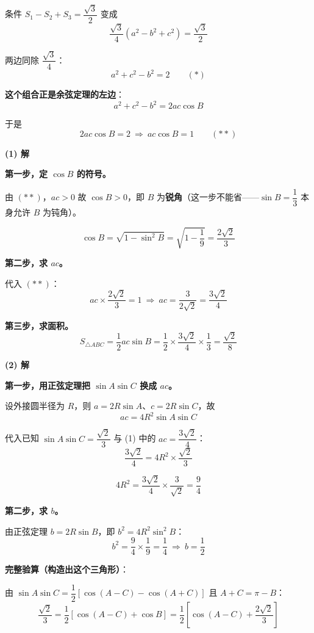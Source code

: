 条件 $S_1-S_2+S_3=\dfrac{\sqrt3}2$ 变成
\[\frac{\sqrt3}4\left(a^{2}-b^{2}+c^{2}\right)=\frac{\sqrt3}2\]

两边同除 $\dfrac{\sqrt3}4$：
\[a^{2}+c^{2}-b^{2}=2\qquad(\ast)\]

\textbf{这个组合正是余弦定理的左边}：
\[a^{2}+c^{2}-b^{2}=2ac\cos B\]

于是
\[2ac\cos B=2\ \Longrightarrow\ ac\cos B=1\qquad(\ast\ast)\]

\par\medskip

\textbf{(1) 解}

\textbf{第一步，定 $\cos B$ 的符号。}

由 $(\ast\ast)$，$ac>0$ 故 $\cos B>0$，即 $B$ 为\textbf{锐角}（这一步不能省——$\sin B=\dfrac13$ 本身允许 $B$ 为钝角）。

\[\cos B=\sqrt{1-\sin^{2}B}=\sqrt{1-\frac19}=\frac{2\sqrt2}3\]

\textbf{第二步，求 $ac$。}

代入 $(\ast\ast)$：
\[ac\times\frac{2\sqrt2}3=1\ \Longrightarrow\ ac=\frac3{2\sqrt2}=\frac{3\sqrt2}4\]

\textbf{第三步，求面积。}
\[S_{\triangle ABC}=\frac12ac\sin B=\frac12\times\frac{3\sqrt2}4\times\frac13=\frac{\sqrt2}8\]


\par\medskip

\textbf{(2) 解}

\textbf{第一步，用正弦定理把 $\sin A\sin C$ 换成 $ac$。}

设外接圆半径为 $R$，则 $a=2R\sin A$、$c=2R\sin C$，故
\[ac=4R^{2}\sin A\sin C\]

代入已知 $\sin A\sin C=\dfrac{\sqrt2}3$ 与 (1) 中的 $ac=\dfrac{3\sqrt2}4$：
\[\frac{3\sqrt2}4=4R^{2}\times\frac{\sqrt2}3\]

\[4R^{2}=\frac{3\sqrt2}4\times\frac3{\sqrt2}=\frac94\]

\textbf{第二步，求 $b$。}

由正弦定理 $b=2R\sin B$，即 $b^{2}=4R^{2}\sin^{2}B$：
\[b^{2}=\frac94\times\frac19=\frac14\ \Longrightarrow\ b=\frac12\]


\textbf{完整验算（构造出这个三角形）}：

由 $\sin A\sin C=\dfrac12\left[\cos(A-C)-\cos(A+C)\right]$ 且 $A+C=\pi-B$：
\[\frac{\sqrt2}3=\frac12\left[\cos(A-C)+\cos B\right]=\frac12\left[\cos(A-C)+\frac{2\sqrt2}3\right]\]

